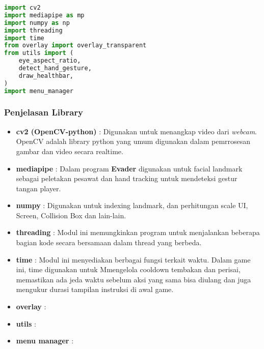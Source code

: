 \documentclass[11pt,a4paper]{article}
\begin{document}
\begin{lstlisting}[language=Python, caption=library pada Main.py]
import cv2
import mediapipe as mp
import numpy as np
import threading
import time
from overlay import overlay_transparent
from utils import (
    eye_aspect_ratio,
    detect_hand_gesture,
    draw_healthbar,
)
import menu_manager
\end{lstlisting}

\subsubsection{Penjelasan Library}

\begin{itemize}
    \item \textbf{cv2 (OpenCV-python)}  :  Digunakan untuk menangkap video dari \textit{webcam}. OpenCV adalah library python yang umum digunakan dalam pemrrosesan gambar dan video secara realtime.
    \item \textbf{mediapipe}    : Dalam program \textbf{Evader} digunakan untuk facial landmark sebagai peletakan pesawat dan hand tracking untuk mendeteksi gestur tangan player.
    \item \textbf{numpy}    : Digunakan untuk indexing landmark, dan perhitungan scale UI, Screen, Collision Box dan lain-lain.
    \item \textbf{threading}    : Modul ini memungkinkan program untuk menjalankan beberapa bagian kode secara bersamaan dalam thread yang berbeda.
    \item \textbf{time} : Modul ini menyediakan berbagai fungsi terkait waktu. Dalam game ini, time digunakan untuk Mmengelola cooldown tembakan dan perisai, memastikan ada jeda waktu sebelum aksi yang sama bisa diulang dan juga mengukur durasi tampilan instruksi di awal game.
    \item \textbf{overlay}  : 
    \item \textbf{utils}    : 
    \item \textbf{menu manager} : 
\end{itemize}
\end{document}
